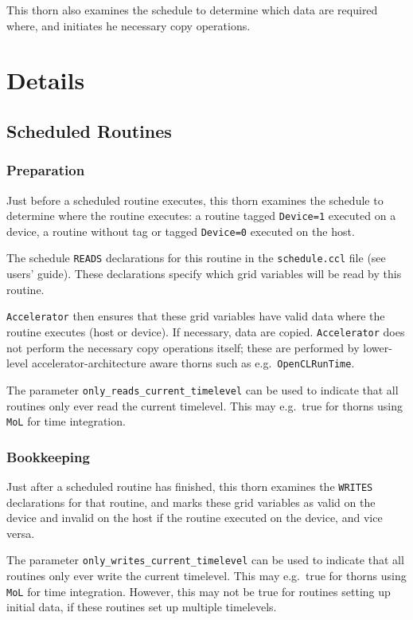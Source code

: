 This thorn also examines the schedule to determine which data are
required where, and initiates he necessary copy operations.



\section{Details}

\subsection{Scheduled Routines}

\subsubsection{Preparation}

Just before a scheduled routine executes, this thorn examines the
schedule to determine where the routine executes: a routine tagged
\texttt{Device=1} executed on a device, a routine without tag or
tagged \texttt{Device=0} executed on the host.

The schedule \texttt{READS} declarations for this routine in the
\texttt{schedule.ccl} file (see users' guide). These declarations
specify which grid variables will be read by this routine.

\texttt{Accelerator} then ensures that these grid variables have valid
data where the routine executes (host or device). If necessary, data
are copied. \texttt{Accelerator} does not perform the necessary copy
operations itself; these are performed by lower-level
accelerator-architecture aware thorns such as
e.g.\ \texttt{OpenCLRunTime}.

The parameter \texttt{only\_reads\_current\_timelevel} can be used to
indicate that all routines only ever read the current timelevel. This
may e.g.\ true for thorns using \texttt{MoL} for time integration.

\subsubsection{Bookkeeping}

Just after a scheduled routine has finished, this thorn examines the
\texttt{WRITES} declarations for that routine, and marks these grid
variables as valid on the device and invalid on the host if the
routine executed on the device, and vice versa.

The parameter \texttt{only\_writes\_current\_timelevel} can be used to
indicate that all routines only ever write the current timelevel. This
may e.g.\ true for thorns using \texttt{MoL} for time integration.
However, this may not be true for routines setting up initial data, if
these routines set up multiple timelevels.



